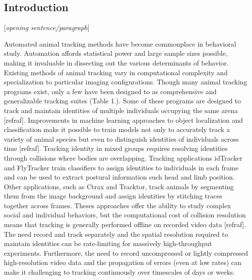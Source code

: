 \documentclass[10pt]{article}
\begin{document}
\vspace{1cm}
\begin{multicols}{2}
\section*{Introduction}

[\textit{opening sentence/paragraph}]

Automated animal tracking methods have become commonplace in behavioral study. Automation affords statistical power and large sample sizes possible, making it invaluable in dissecting out the various determinants of behavior. Existing methods of animal tracking vary in computational complexity and specialization to particular imaging configurations. Though many animal tracking programs exist, only a few have been designed to as comprehensive and generalizable tracking suites (Table 1.). Some of these programs are designed to track and maintain identities of multiple individuals occupying the same arena [refraf]. Improvements in machine learning approaches to object localization and classification make it possible to train models not only to accurately track a variety of animal species but even to distinguish identities of individuals across time [refraf]. Tracking identity in mixed groups requires resolving identities through collisions where bodies are overlapping. Tracking applications idTracker and FlyTracker train classifiers to assign identities to individuals in each frame and can be used to extract postural information such head and limb position. Other applications, such as Ctrax and Tracktor, track animals by segmenting them from the image background and assign identities by stitching traces together across frames. Theses approaches offer the ability to study complex social and individual behaviors, but the computational cost of collision resolution means that tracking is generally performed offline on recorded video data [refraf]. The need record and track separately and the spatial resolution required to maintain identities can be rate-limiting for massively high-throughput experiments. Furthermore, the need to record uncompressed or lightly compressed high-resolution video data and the propagation of errors (even at low rates) can make it challenging to tracking continuously over timescales of days or weeks.


\end{multicols}
\end{document}
